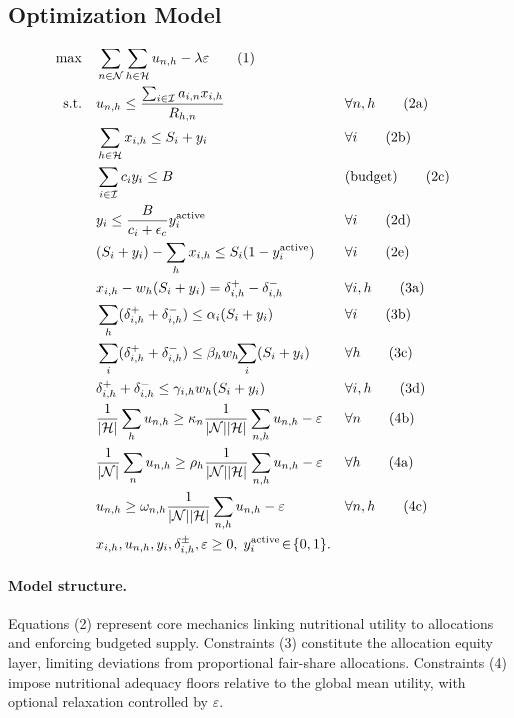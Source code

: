 \documentclass[preprint,12pt]{elsarticle}
\begin{document}
\subsection{Optimization Model}
\begin{align}
\max \quad & \sum_{n \in \mathcal{N}}\sum_{h \in \mathcal{H}} u_{n,h} - \lambda \varepsilon \tag{1}\\
\text{s.t.}\quad 
& u_{n,h} \le \frac{\sum_{i \in \mathcal{I}} a_{i,n} x_{i,h}}{R_{h,n}} && \forall n,h \tag{2a}\\
& \sum_{h \in \mathcal{H}} x_{i,h} \le S_i + y_i && \forall i \tag{2b}\\
& \sum_{i \in \mathcal{I}} c_i y_i \le B && \text{(budget)} \tag{2c}\\
& y_i \le \frac{B}{c_i+\epsilon_c} y_i^{\mathrm{active}} && \forall i \tag{2d}\\
& (S_i+y_i) - \sum_{h} x_{i,h} \le S_i(1-y_i^{\mathrm{active}}) && \forall i \tag{2e}\\
& x_{i,h} - w_h(S_i+y_i) = \delta_{i,h}^{+}-\delta_{i,h}^{-} && \forall i,h \tag{3a}\\
& \sum_{h} (\delta_{i,h}^{+}+\delta_{i,h}^{-}) \le \alpha_i (S_i+y_i) && \forall i \tag{3b}\\
& \sum_{i} (\delta_{i,h}^{+}+\delta_{i,h}^{-}) \le \beta_h w_h\!\!\sum_{i}(S_i+y_i) && \forall h \tag{3c}\\
& \delta_{i,h}^{+}+\delta_{i,h}^{-} \le \gamma_{i,h}w_h(S_i+y_i) && \forall i,h \tag{3d}\\
& \frac{1}{|\mathcal{H}|}\sum_{h} u_{n,h} \ge \kappa_n \frac{1}{|\mathcal{N}||\mathcal{H}|}\sum_{n,h} u_{n,h} - \varepsilon && \forall n \tag{4b}\\
& \frac{1}{|\mathcal{N}|}\sum_{n} u_{n,h} \ge \rho_h \frac{1}{|\mathcal{N}||\mathcal{H}|}\sum_{n,h} u_{n,h} - \varepsilon && \forall h \tag{4a}\\
& u_{n,h} \ge \omega_{n,h} \frac{1}{|\mathcal{N}||\mathcal{H}|}\sum_{n,h} u_{n,h} - \varepsilon && \forall n,h \tag{4c}\\
& x_{i,h},u_{n,h},y_i,\delta_{i,h}^{\pm},\varepsilon \ge 0,\; y_i^{\mathrm{active}}\!\in\!\{0,1\}. \notag
\end{align}

\paragraph{Model structure.}
Equations (2) represent core mechanics linking nutritional utility to allocations and enforcing budgeted supply. Constraints (3) constitute the allocation equity layer, limiting deviations from proportional fair-share allocations. Constraints (4) impose nutritional adequacy floors relative to the global mean utility, with optional relaxation controlled by $\varepsilon$.
\end{document}
